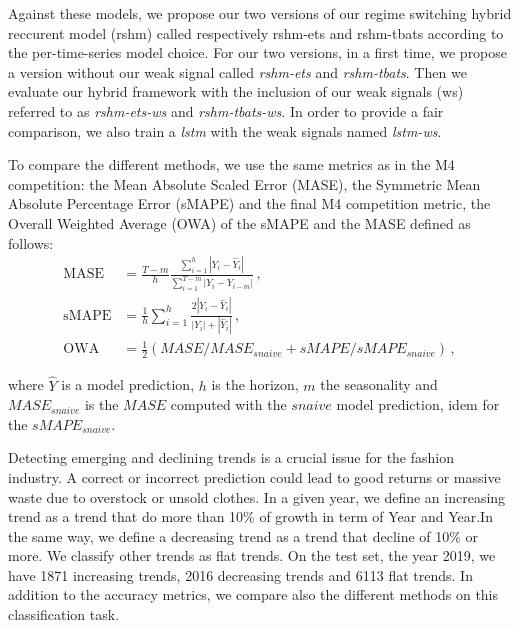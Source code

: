 \documentclass{article} %
\newcommand{\lag}{h}
\begin{document}
Against these models, we propose our two versions of our regime switching hybrid reccurent model (rshm) called respectively rshm-ets and rshm-tbats according to the per-time-series model choice.
For our two versions, in a first time, we propose a version without our weak signal called \textit{rshm-ets} and \textit{rshm-tbats}. Then we evaluate our hybrid framework with the inclusion of our weak signals (ws) referred to as \textit{rshm-ets-ws} and \textit{rshm-tbats-ws}. In order to provide a fair comparison, we also train a \textit{lstm} with the weak signals named \textit{lstm-ws}.


To compare the different methods, we use the same metrics as in the M4 competition: the Mean Absolute Scaled Error (MASE), the Symmetric Mean Absolute Percentage Error (sMAPE) and the final M4 competition metric, the Overall Weighted Average (OWA) of the sMAPE and the MASE defined as follows:
\begin{align*}
\mathrm{MASE} &= \frac{T-m}{h}\frac{\sum_{i=1}^h |Y_i - \hat{Y}_i| }{\sum_{i=1}^{T-m} |Y_i - Y_{i-m}|}\,,\\
\mathrm{sMAPE} &= \frac{1}{h} \sum_{i=1}^h \frac{2|Y_i - \hat{Y}_i|}{|Y_i| + |\hat{Y}_i|}\,,\\
\mathrm{OWA} &= \frac{1}{2}\left(MASE/MASE_{snaive} + sMAPE/sMAPE_{snaive}\right)\,,
\end{align*}

where $\hat{Y}$ is a model prediction, $\lag$ is the horizon, $m$ the seasonality and $MASE_{snaive}$ is the $MASE$ computed with the $snaive$ model prediction, idem for the $sMAPE_{snaive}$.



Detecting emerging and declining trends is a crucial issue for the fashion industry. A correct or incorrect prediction could lead to good returns or massive waste due to overstock or unsold clothes. In a given year, we define an increasing trend as a trend that do more than 10\% of growth in term of Year and Year.In the same way, we define a decreasing trend as a trend that decline of 10\% or more. We classify other trends as flat trends. On the test set, the year 2019, we have 1871 increasing trends, 2016 decreasing trends and 6113 flat trends. In addition to the accuracy metrics, we compare also the different methods on this classification task.
\end{document}
